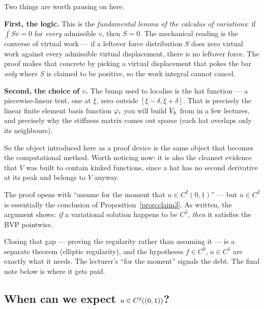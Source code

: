 \begin{intuition}
Two things are worth pausing on here.

\textbf{First, the logic.} This is the \emph{fundamental lemma of the calculus
of variations}: if $\int S v = 0$ for \emph{every} admissible $v$, then $S=0$.
The mechanical reading is the converse of virtual work --- if a leftover force
distribution $S$ does zero virtual work against every admissible virtual
displacement, there is no leftover force. The proof makes that concrete by
picking a virtual displacement that pokes the bar \emph{only} where $S$ is
claimed to be positive, so the work integral cannot cancel.

\textbf{Second, the choice of $v$.} The bump used to localise is the hat
function --- a piecewise-linear tent, one at $\xi$, zero outside
$[\xi-\delta,\xi+\delta]$. That is precisely the linear finite element basis
function $\phih_{i}$ you will build $\Vh$ from in a few lectures, and precisely
why the stiffness matrix comes out sparse (each hat overlaps only its
neighbours).

So the object introduced here as a proof device is the same object that becomes
the computational method. Worth noticing now: it is also the cleanest evidence
that $V$ was built to contain kinked functions, since a hat has no second
derivative at its peak and belongs to $V$ anyway.
\end{intuition}

\begin{pitfall}
The proof opens with ``assume for the moment that $u\in C^{2}(0,1)$'' --- but
$u\in C^{2}$ is essentially the conclusion of Proposition~\ref{prop:claim3}.
As written, the argument shows: \emph{if} a variational solution happens to be
$C^{2}$, \emph{then} it satisfies the BVP pointwise.

Closing that gap --- proving the regularity rather than assuming it --- is a
separate theorem (elliptic regularity), and the hypotheses $f\in C^{0}$,
$a\in C^{1}$ are exactly what it needs. The lecturer's ``for the moment''
signals the debt. The final note below is where it gets paid.
\end{pitfall}

\subsection*{When can we expect $u\in\Ck[(0,1)]{2}$?}

